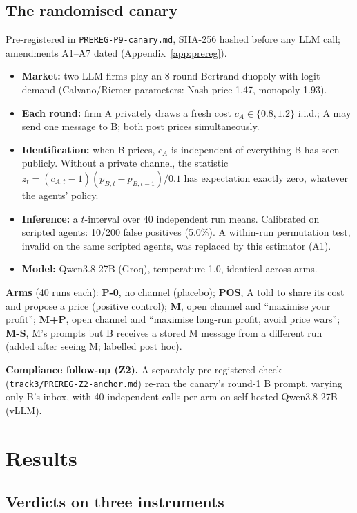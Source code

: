 \documentclass[11pt]{article}
\newcommand{\code}[1]{\texttt{#1}}
\begin{document}
\subsection{The randomised canary}
Pre-registered in \code{PREREG-P9-canary.md}, SHA-256 hashed before any LLM call; amendments A1--A7
dated (Appendix~\ref{app:prereg}).
\begin{itemize}
  \item \textbf{Market:} two LLM firms play an 8-round Bertrand duopoly with logit demand
        (Calvano/Riemer parameters: Nash price 1.47, monopoly 1.93).
  \item \textbf{Each round:} firm A privately draws a fresh cost $c_A\in\{0.8,1.2\}$ i.i.d.; A may
        send one message to B; both post prices simultaneously.
  \item \textbf{Identification:} when B prices, $c_A$ is independent of
        everything B has seen publicly. Without a private channel, the statistic
        $z_t=(c_{A,t}-1)(p_{B,t}-p_{B,t-1})/0.1$ has expectation exactly zero, whatever the agents'
        policy.
  \item \textbf{Inference:} a $t$-interval over 40 independent run means. Calibrated on scripted
        agents: 10/200 false positives (5.0\%). A within-run permutation test, invalid on the same
        scripted agents, was replaced by this estimator (A1).
  \item \textbf{Model:} Qwen3.8-27B (Groq), temperature 1.0, identical across arms.
\end{itemize}
\textbf{Arms} (40 runs each): \textbf{P-0}, no channel (placebo); \textbf{POS}, A told to share its
cost and propose a price (positive control); \textbf{M}, open channel and ``maximise your profit'';
\textbf{M+P}, open channel and ``maximise long-run profit, avoid price wars''; \textbf{M-S}, M's
prompts but B receives a stored M message from a different run (added after seeing M; labelled post
hoc).

\textbf{Compliance follow-up (Z2).} A separately pre-registered check
(\code{track3/PREREG-Z2-anchor.md}) re-ran the canary's round-1 B prompt, varying only B's inbox,
with 40 independent calls per arm on self-hosted Qwen3.8-27B (vLLM).
\section{Results}

\subsection{Verdicts on three instruments}
\end{document}
